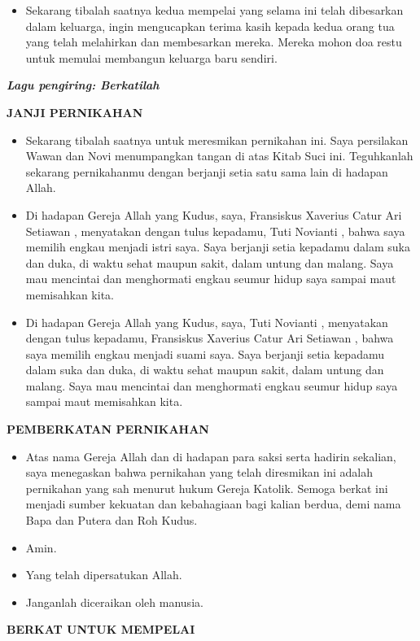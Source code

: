 \documentclass[10pt]{book}
\makeatletter
\newcommand{\subjudul}[1]{%
  {\parindent \z@ \normalfont
    \interlinepenalty\@M \bfseries #1\par\nobreak \vskip 20\p@ }}
\newcommand{\lagu}[1]{%
  {\parindent \z@ \normalfont
    \interlinepenalty\@M \bfseries \emph{#1}\par\nobreak \vskip 20\p@ }}
\newcommand{\BU}[1]{\begin{itemize} \item[U:] #1 \end{itemize}}
\newcommand{\BI}[1]{\begin{itemize} \item[I:] #1 \end{itemize}}
\newcommand{\BL}[1]{\begin{itemize} \item[Wawan:] #1 \end{itemize}}
\newcommand{\BW}[1]{\begin{itemize} \item[Novi:] #1 \end{itemize}}
\newcommand{\mempelaip}{Fransiskus Xaverius Catur Ari Setiawan }
\newcommand{\mempelaiw}{Tuti Novianti }
\makeatother
\begin{document}
\BI{Sekarang tibalah saatnya kedua mempelai yang selama ini telah dibesarkan dalam keluarga, ingin mengucapkan terima kasih kepada kedua orang tua yang telah melahirkan dan membesarkan mereka. Mereka mohon doa restu untuk memulai membangun keluarga baru sendiri.}


\lagu{Lagu pengiring: Berkatilah}



\subjudul{JANJI PERNIKAHAN}

\BI{Sekarang tibalah saatnya untuk meresmikan pernikahan ini.  Saya persilakan Wawan dan Novi menumpangkan tangan di atas Kitab Suci ini. Teguhkanlah sekarang pernikahanmu dengan berjanji setia satu sama lain di hadapan Allah.}

\BL{Di hadapan Gereja Allah yang Kudus, saya, \mempelaip, menyatakan dengan tulus kepadamu, \mempelaiw, bahwa saya memilih engkau menjadi istri saya. Saya berjanji setia kepadamu dalam suka dan duka, di waktu sehat maupun sakit, dalam untung dan malang. Saya mau mencintai dan menghormati engkau seumur hidup saya sampai maut memisahkan kita.}

\BW{Di hadapan Gereja Allah yang Kudus, saya, \mempelaiw, menyatakan dengan tulus kepadamu, \mempelaip, bahwa saya memilih engkau menjadi suami saya. Saya berjanji setia kepadamu dalam suka dan duka, di waktu sehat maupun sakit, dalam untung dan malang. Saya mau mencintai dan menghormati engkau seumur hidup saya sampai maut memisahkan kita.}


\subjudul{PEMBERKATAN PERNIKAHAN}

\BI{Atas nama Gereja Allah dan di hadapan para saksi serta hadirin sekalian, saya menegaskan bahwa pernikahan yang telah diresmikan ini adalah pernikahan yang sah menurut hukum Gereja Katolik. Semoga berkat ini menjadi sumber kekuatan dan kebahagiaan bagi kalian berdua, demi nama Bapa dan Putera dan Roh Kudus.}

\BU{Amin.}

\BI{Yang telah dipersatukan Allah.}

\BU{Janganlah diceraikan oleh manusia.}


\subjudul{BERKAT UNTUK MEMPELAI}
\end{document}
